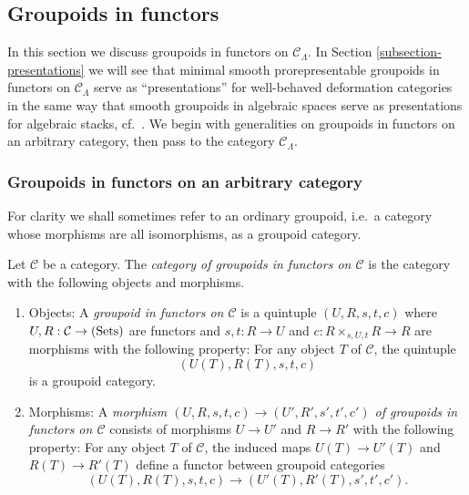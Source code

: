 \subsection{Groupoids in functors}
\label{subsection-groupoids-in-functors}
In this section we discuss groupoids in functors on $\mathcal C_{\Lambda}$.  In 
Section \ref{subsection-presentations} we will see that minimal smooth 
prorepresentable groupoids in functors on $\mathcal C_{\Lambda}$ serve as 
``presentations'' for well-behaved deformation categories in the same way that 
smooth groupoids in algebraic spaces serve as presentations for algebraic 
stacks, cf.\ \cite[Section 49.16]{stacks-project}.  We begin with generalities 
on groupoids in functors on an arbitrary category, then pass to the category 
$\mathcal C_{\Lambda}$.

\subsubsection{Groupoids in functors on an arbitrary category}
For clarity we shall sometimes refer to an ordinary groupoid, i.e.\ a category 
whose morphisms are all isomorphisms, as a groupoid category.

\begin{definition}
\label{definition-groupoid-in-functors}
Let $\mathcal C$ be a category. The \emph{category of groupoids in functors on 
$\mathcal C$} is the category with the following objects and morphisms.
\begin{enumerate}
\item Objects: A \emph{groupoid in functors on $\mathcal C$} is a quintuple 
$(U,R,s,t,c)$ where $U,R: \mathcal C \rightarrow \textnormal{(Sets)}$ are 
functors and $s,t: R \rightarrow U$ and $c: R \times_{s,U,t} R \rightarrow R$ 
are morphisms with the following property: For any object $T$ of $\mathcal C$, 
the quintuple
\[ (U(T), R(T), s,t,c) \]
is a groupoid category.
\item Morphisms: A \emph{morphism $(U,R,s,t,c) \rightarrow (U',R',s',t',c')$ of 
groupoids in functors on $\mathcal C$} consists of morphisms $U \rightarrow U'$ 
and $R \rightarrow R'$ with the following property: For any object $T$ of 
$\mathcal C$, the induced maps $U(T) \rightarrow U'(T)$ and $R(T) \rightarrow 
R'(T)$ define a functor between groupoid categories
\[ (U(T), R(T), s,t,c) \rightarrow (U'(T), R'(T), s',t',c') .\] 
\end{enumerate}
\end{definition}

